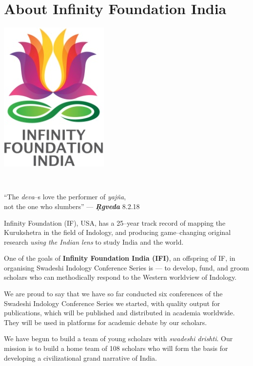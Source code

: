 
\chapter*{About Infinity Foundation India}\label{about}

\vspace{-1cm}

\begin{center}
\includegraphics[scale=0.23]{images/logo.png}
\end{center}

\begin{center}
\\
\end{center}

\begin{center}
“The \textit{deva}–s love the performer of \textit{yajña},\\ not the one who slumbers” — \textbf{\textit{Ṛgveda}} 8.2.18
\end{center}

Infinity Foundation (IF), USA, has a 25–year track record of mapping the Kurukshetra in the field of Indology, and producing game–changing original research \textit{using the Indian lens} to study India and the world.

One of the goals of \textbf{Infinity Foundation India (IFI)}, an offspring of IF, in organising Swadeshi Indology Conference Series is — to develop, fund, and groom scholars who can methodically respond to the Western worldview of Indology.

We are proud to say that we have so far conducted six conferences of the Swadeshi Indology Conference Series we started, with quality output for publications, which will be published and distributed in academia worldwide. They will be used in platforms for academic debate by our scholars.

We have begun to build a team of young scholars with \textit{swadeshi drishti}. Our mission is to build a home team of 108 scholars who will form the basis for developing a civilizational grand narrative of India.

